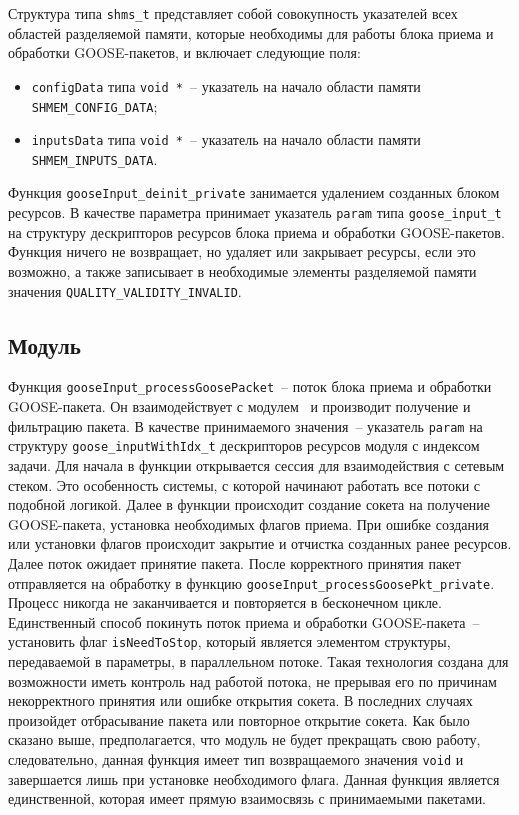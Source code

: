Структура типа \lstinline{shms_t} представляет собой совокупность указателей всех областей разделяемой памяти, которые необходимы для работы блока приема и обработки GOOSE-пакетов, и включает следующие поля:

\begin{itemize}
    \item \lstinline{configData} типа \lstinline{void *}~-- указатель на начало области памяти \lstinline{SHMEM_CONFIG_DATA};
    \item \lstinline{inputsData} типа \lstinline{void *}~-- указатель на начало области памяти \lstinline{SHMEM_INPUTS_DATA}.
\end{itemize}

Функция \lstinline{gooseInput_deinit_private} занимается удалением созданных блоком ресурсов. В качестве параметра принимает указатель \lstinline{param} типа
\lstinline{goose_input_t} на структуру дескрипторов ресурсов блока приема и обработки GOOSE-пакетов. Функция ничего не возвращает, но удаляет или закрывает ресурсы,
если это возможно, а также записывает в необходимые элементы разделяемой памяти
значения \lstinline{QUALITY_VALIDITY_INVALID}.

\subsection{Модуль \moduleRecvPackets}

Функция \lstinline{gooseInput_processGoosePacket}~-- поток блока приема и обработки GOOSE-пакета. Он взаимодействует с модулем \moduleOsal\ и производит получение и фильтрацию пакета. В качестве принимаемого значения~-- указатель \lstinline{param} на структуру
\lstinline{goose_inputWithIdx_t} дескрипторов ресурсов модуля с индексом задачи. Для начала в функции открывается сессия для взаимодействия с сетевым стеком. Это особенность системы, с которой начинают работать все потоки с подобной логикой. Далее в функции происходит создание сокета на получение GOOSE-пакета, установка необходимых флагов приема. При ошибке создания или установки флагов происходит закрытие и отчистка созданных ранее ресурсов. Далее поток ожидает принятие пакета. После корректного принятия пакет отправляется на обработку в функцию \lstinline{gooseInput_processGoosePkt_private}. Процесс никогда не заканчивается и повторяется в бесконечном цикле. Единственный способ покинуть поток приема и обработки GOOSE-пакета~-- установить флаг \lstinline{isNeedToStop}, который является элементом структуры, передаваемой в параметры, в параллельном потоке. Такая технология создана для возможности иметь контроль над работой потока, не прерывая его по причинам некорректного принятия или ошибке открытия сокета. В последних случаях произойдет отбрасывание пакета или повторное открытие сокета. Как было сказано выше, предполагается, что модуль не будет прекращать свою работу, следовательно, данная функция имеет тип возвращаемого значения \lstinline{void} и завершается лишь при установке необходимого флага. Данная функция является единственной, которая имеет прямую взаимосвязь с принимаемыми пакетами.

